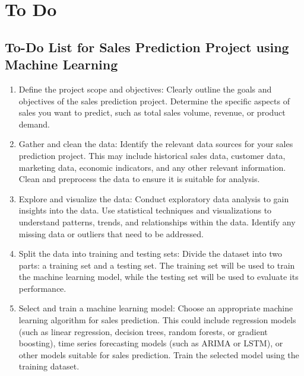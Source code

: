 %
%




\chapter{To Do}


	\section{To-Do List for Sales Prediction Project using Machine Learning}
	
	\begin{enumerate}
		\item Define the project scope and objectives: Clearly outline the goals and objectives of the sales prediction project. Determine the specific aspects of sales you want to predict, such as total sales volume, revenue, or product demand.
		
		\item Gather and clean the data: Identify the relevant data sources for your sales prediction project. This may include historical sales data, customer data, marketing data, economic indicators, and any other relevant information. Clean and preprocess the data to ensure it is suitable for analysis.
		
		\item Explore and visualize the data: Conduct exploratory data analysis to gain insights into the data. Use statistical techniques and visualizations to understand patterns, trends, and relationships within the data. Identify any missing data or outliers that need to be addressed.
		
		\item Split the data into training and testing sets: Divide the dataset into two parts: a training set and a testing set. The training set will be used to train the machine learning model, while the testing set will be used to evaluate its performance.
		
		\item Select and train a machine learning model: Choose an appropriate machine learning algorithm for sales prediction. This could include regression models (such as linear regression, decision trees, random forests, or gradient boosting), time series forecasting models (such as ARIMA or LSTM), or other models suitable for sales prediction. Train the selected model using the training dataset.
		

\end{enumerate}
